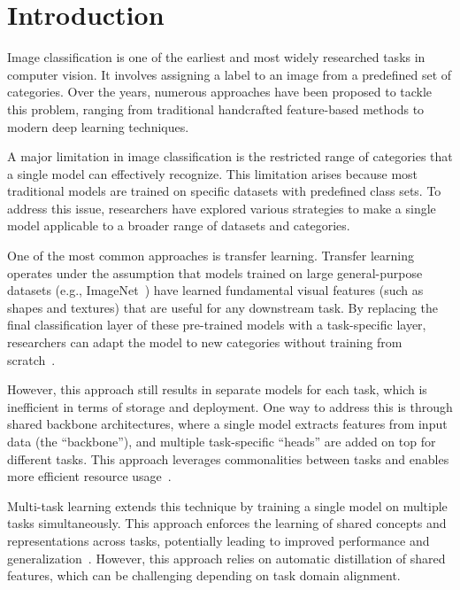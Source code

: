 \chapter{Introduction}

Image classification is one of the earliest and most widely researched tasks in computer vision.
It involves assigning a label to an image from a predefined set of categories.
Over the years, numerous approaches have been proposed to tackle this problem, ranging from traditional handcrafted feature-based methods to modern deep learning techniques.

A major limitation in image classification is the restricted range of categories that a single model can effectively recognize.
This limitation arises because most traditional models are trained on specific datasets with predefined class sets.
To address this issue, researchers have explored various strategies to make a single model applicable to a broader range of datasets and categories.

One of the most common approaches is transfer learning.
Transfer learning operates under the assumption that models trained on large general-purpose datasets (e.g., ImageNet~\cite{deng_imagenet_2009,russakovsky_imagenet_2015})
have learned fundamental visual features (such as shapes and textures) that are useful for any downstream task.
By replacing the final classification layer of these pre-trained models with a task-specific layer,
researchers can adapt the model to new categories without training from scratch~\cite{pan_survey_2010,zhuang_comprehensive_2020}.

However, this approach still results in separate models for each task,
which is inefficient in terms of storage and deployment.
One way to address this is through shared backbone architectures, where a single model extracts features from input data (the \enquote{backbone}),
and multiple task-specific \enquote{heads} are added on top for different tasks.
This approach leverages commonalities between tasks and enables more efficient resource usage~\cite{vaswani_attention_2023}.

Multi-task learning extends this technique by training a single model on multiple tasks simultaneously.
This approach enforces the learning of shared concepts and representations across tasks,
potentially leading to improved performance and generalization~\cite{zhang_overview_2018}.
However, this approach relies on automatic distillation of shared features,
which can be challenging depending on task domain alignment.

